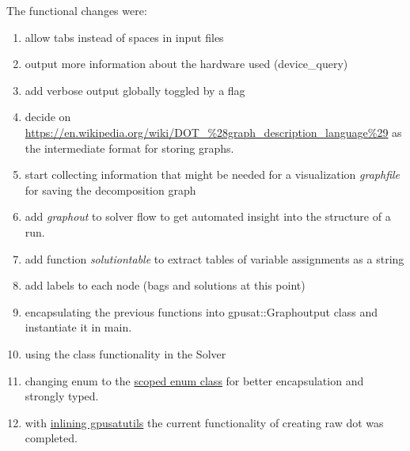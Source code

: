 \documentclass[a4paper, 12pt]{scrartcl}
\begin{document}
The functional changes were:
\begin{enumerate}
	\item allow tabs instead of spaces in input files
	\item output more information about the hardware used (device\_query)
	\item add verbose output globally toggled by a flag 
	\item decide on \url{https://en.wikipedia.org/wiki/DOT_\%28graph_description_language\%29} 
		as the intermediate format for storing graphs.
	\item start collecting information that might be needed for a visualization
		\emph{graphfile} for saving the decomposition graph
	\item add \emph{graphout }to solver flow to get automated insight into the structure of a run.
	
	\item add function \emph{solutiontable} to extract tables of variable assignments as a string
	\item add labels to each node (bags and solutions at this point)
	\item encapsulating the previous functions into gpusat::Graphoutput class and instantiate it in main.
	\item using the class functionality in the Solver
	\item changing enum to the \href{https://coders-corner.net/2017/08/13/scoped-vs-unscoped-enum/}{scoped enum class} for better encapsulation and strongly typed.
	\item with \href{https://github.com/daajoe/GPUSAT/commit/cfb310}{inlining gpusatutils} the current functionality of creating raw dot was completed.
	

\end{enumerate}
\end{document}
